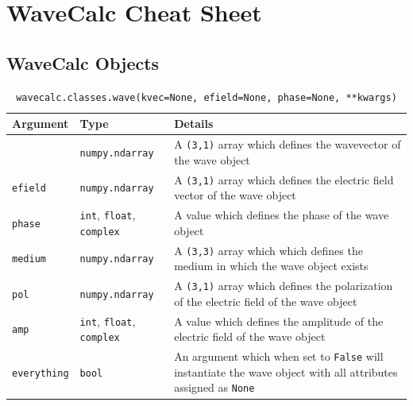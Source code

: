 \documentclass[11pt, reqno]{book}%
\newcounter{ct}
\newcommand{\tw}[1]{{\tt #1}}
\begin{document}

\chapter{WaveCalc Cheat Sheet}
\label{chap:cheatsheet}

\section{WaveCalc Objects}
\label{sec:objectscheat}

\begin{table}[ht]
\begin{center}
\caption*{\tw{wavecalc.classes.wave(kvec=None, efield=None, phase=None, **kwargs)}}
\begin{tabular}{>{\centering\arraybackslash}m{3.5cm}|>{\centering\arraybackslash}m{3.5cm}|>{\arraybackslash}m{6.5cm}}
\hline
 \textbf{Argument} & \textbf{Type} & \textbf{Details} \\
 \hline
 \tw{kvec} & \tw{numpy.ndarray} & A \tw{(3,1)} array which defines the wavevector of the wave object \\
 \hline
 \tw{efield} & \tw{numpy.ndarray} & A \tw{(3,1)} array which defines the electric field vector of the wave object \\
 \hline
  \tw{phase} & \tw{int}, \tw{float}, \tw{complex} & A value which defines the phase of the wave object \\
 \hline
  \tw{medium} & \tw{numpy.ndarray} & A \tw{(3,3)} array which which defines the medium in which the wave object exists\\
 \hline
 \tw{pol} & \tw{numpy.ndarray} & A \tw{(3,1)} array which defines the polarization of the electric field of the wave object\\
 \hline
  \tw{amp} & \tw{int}, \tw{float}, \tw{complex} & A value which defines the amplitude of the electric field of the wave object \\
 \hline
 \tw{everything} & \tw{bool} & An argument which when set to \tw{False} will instantiate the wave object with all attributes assigned as \tw{None} \\
 \hline
\end{tabular}
\label{tab:wavcheatsheet}
\end{center}
\end{table}
\end{document}
